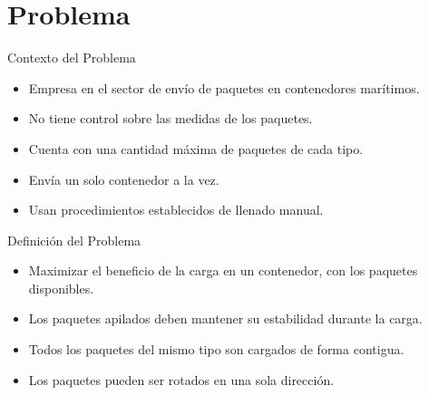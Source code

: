 \documentclass[handout]{beamer}
\begin{document}
\section{Problema}

\begin{frame}{Contexto del Problema}
    \begin{itemize}[<+-| alert@+>]
        \item Empresa en el sector de envío de paquetes en contenedores marítimos.
        \item No tiene control sobre las medidas de los paquetes.
        \item Cuenta con una cantidad máxima de paquetes de cada tipo.
        \item Envía un solo contenedor a la vez.
        \item Usan procedimientos establecidos de llenado manual.
    \end{itemize}
\end{frame}

\begin{frame}{Definición del Problema}
    \begin{itemize}[<+-| alert@+>]
        \item Maximizar el beneficio de la carga en un contenedor, con los paquetes disponibles.
        \item Los paquetes apilados deben mantener su estabilidad durante la carga.
        \item Todos los paquetes del mismo tipo son cargados de forma contigua.
        \item Los paquetes pueden ser rotados en una sola dirección.
    \end{itemize}
\end{frame}
\end{document}
